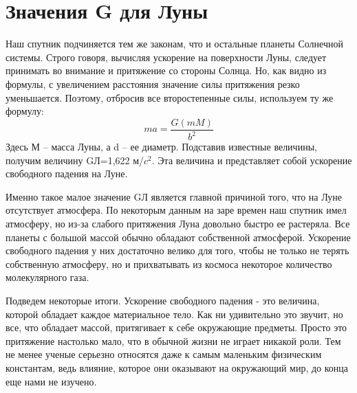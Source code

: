 \documentclass{article}
\begin{document}
\section{Значения G для Луны}
Наш спутник подчиняется тем же законам, что и остальные планеты Солнечной системы. Строго говоря, вычисляя ускорение на поверхности Луны, следует принимать во внимание и притяжение со стороны Солнца.
Но, как видно из формулы, с увеличением расстояния значение силы притяжения резко уменьшается. Поэтому, отбросив все второстепенные силы, используем ту же формулу:
\begin{equation}
ma=\frac {G(mM)}{b^2}
\end{equation}
Здесь М – масса Луны, а d – ее диаметр. Подставив известные величины, получим величину GЛ=1,622 м/\(c^2\). Эта величина и представляет собой ускорение свободного падения на Луне.

Именно такое малое значение GЛ является главной причиной того, что на Луне отсутствует атмосфера. По некоторым данным на заре времен наш спутник имел атмосферу, но из-за слабого притяжения Луна довольно быстро ее растеряла. Все планеты с большой массой обычно обладают собственной атмосферой. Ускорение свободного падения у них достаточно велико для того, чтобы не только не терять собственную атмосферу, но и прихватывать из космоса некоторое количество молекулярного газа. 

Подведем некоторые итоги. Ускорение свободного падения - это величина, которой обладает каждое материальное тело. Как ни удивительно это звучит, но все, что обладает массой, притягивает к себе окружающие предметы. Просто это притяжение настолько мало, что в обычной жизни не играет никакой роли. Тем не менее ученые серьезно относятся даже к самым маленьким физическим константам, ведь влияние, которое они оказывают на окружающий мир, до конца еще нами не изучено.
\end{document}
